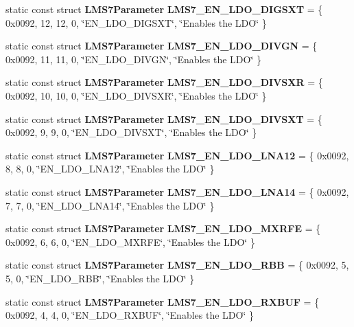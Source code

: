 \begin{DoxyCompactItemize}
\item 
static const struct {\bf L\+M\+S7\+Parameter} {\bf L\+M\+S7\+\_\+\+E\+N\+\_\+\+L\+D\+O\+\_\+\+D\+I\+G\+S\+XT} = \{ 0x0092, 12, 12, 0, \char`\"{}\+E\+N\+\_\+\+L\+D\+O\+\_\+\+D\+I\+G\+S\+X\+T\char`\"{}, \char`\"{}\+Enables the L\+D\+O\char`\"{} \}
\item 
static const struct {\bf L\+M\+S7\+Parameter} {\bf L\+M\+S7\+\_\+\+E\+N\+\_\+\+L\+D\+O\+\_\+\+D\+I\+V\+GN} = \{ 0x0092, 11, 11, 0, \char`\"{}\+E\+N\+\_\+\+L\+D\+O\+\_\+\+D\+I\+V\+G\+N\char`\"{}, \char`\"{}\+Enables the L\+D\+O\char`\"{} \}
\item 
static const struct {\bf L\+M\+S7\+Parameter} {\bf L\+M\+S7\+\_\+\+E\+N\+\_\+\+L\+D\+O\+\_\+\+D\+I\+V\+S\+XR} = \{ 0x0092, 10, 10, 0, \char`\"{}\+E\+N\+\_\+\+L\+D\+O\+\_\+\+D\+I\+V\+S\+X\+R\char`\"{}, \char`\"{}\+Enables the L\+D\+O\char`\"{} \}
\item 
static const struct {\bf L\+M\+S7\+Parameter} {\bf L\+M\+S7\+\_\+\+E\+N\+\_\+\+L\+D\+O\+\_\+\+D\+I\+V\+S\+XT} = \{ 0x0092, 9, 9, 0, \char`\"{}\+E\+N\+\_\+\+L\+D\+O\+\_\+\+D\+I\+V\+S\+X\+T\char`\"{}, \char`\"{}\+Enables the L\+D\+O\char`\"{} \}
\item 
static const struct {\bf L\+M\+S7\+Parameter} {\bf L\+M\+S7\+\_\+\+E\+N\+\_\+\+L\+D\+O\+\_\+\+L\+N\+A12} = \{ 0x0092, 8, 8, 0, \char`\"{}\+E\+N\+\_\+\+L\+D\+O\+\_\+\+L\+N\+A12\char`\"{}, \char`\"{}\+Enables the L\+D\+O\char`\"{} \}
\item 
static const struct {\bf L\+M\+S7\+Parameter} {\bf L\+M\+S7\+\_\+\+E\+N\+\_\+\+L\+D\+O\+\_\+\+L\+N\+A14} = \{ 0x0092, 7, 7, 0, \char`\"{}\+E\+N\+\_\+\+L\+D\+O\+\_\+\+L\+N\+A14\char`\"{}, \char`\"{}\+Enables the L\+D\+O\char`\"{} \}
\item 
static const struct {\bf L\+M\+S7\+Parameter} {\bf L\+M\+S7\+\_\+\+E\+N\+\_\+\+L\+D\+O\+\_\+\+M\+X\+R\+FE} = \{ 0x0092, 6, 6, 0, \char`\"{}\+E\+N\+\_\+\+L\+D\+O\+\_\+\+M\+X\+R\+F\+E\char`\"{}, \char`\"{}\+Enables the L\+D\+O\char`\"{} \}
\item 
static const struct {\bf L\+M\+S7\+Parameter} {\bf L\+M\+S7\+\_\+\+E\+N\+\_\+\+L\+D\+O\+\_\+\+R\+BB} = \{ 0x0092, 5, 5, 0, \char`\"{}\+E\+N\+\_\+\+L\+D\+O\+\_\+\+R\+B\+B\char`\"{}, \char`\"{}\+Enables the L\+D\+O\char`\"{} \}
\item 
static const struct {\bf L\+M\+S7\+Parameter} {\bf L\+M\+S7\+\_\+\+E\+N\+\_\+\+L\+D\+O\+\_\+\+R\+X\+B\+UF} = \{ 0x0092, 4, 4, 0, \char`\"{}\+E\+N\+\_\+\+L\+D\+O\+\_\+\+R\+X\+B\+U\+F\char`\"{}, \char`\"{}\+Enables the L\+D\+O\char`\"{} \}
\item 

\end{DoxyCompactItemize}
